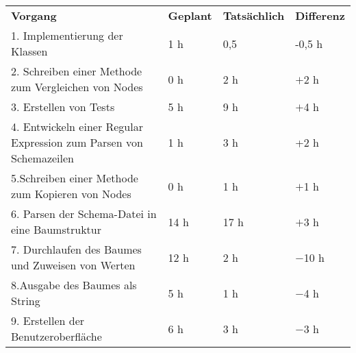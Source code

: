 \begin{tabular}{llll}
\rowcolor{heading}\textbf{Vorgang} & \textbf{Geplant} & \textbf{Tatsächlich} & \textbf{Differenz} \\
1. Implementierung der Klassen & 1 h & 0,5 &  -0,5 h\\
\rowcolor{odd}2. Schreiben einer Methode zum Vergleichen von Nodes & 0 h & 2 h & $+$2 h\\
3. Erstellen von Tests & 5 h   & 9 h   & $+$4 h \\
\rowcolor{odd}4. Entwickeln einer Regular Expression zum Parsen von Schemazeilen & 1 h & 3 h  & +2 h\\
5.Schreiben einer Methode zum Kopieren von Nodes & 0 h & 1 h & $+$1 h \\
\rowcolor{odd}6. Parsen der Schema-Datei in eine Baumstruktur & 14 h & 17 h & $+$3 h \\
7. Durchlaufen des Baumes und Zuweisen von Werten & 12 h & 2 h & $-$10 h \\
\rowcolor{odd}8.Ausgabe des Baumes als String & 5 h & 1 h & $-$4 h \\
9. Erstellen der Benutzeroberfläche & 6 h & 3 h & $-$3 h\\
\end{tabular}
